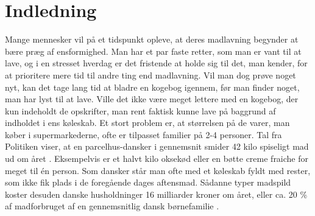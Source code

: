 \chapter{Indledning}
\label{chap:indledning}

Mange mennesker vil på et tidspunkt opleve, at deres madlavning begynder at bære præg af ensformighed. Man har et par faste retter, som man er vant til at lave, og i en stresset hverdag er det fristende at holde sig til det, man kender, for at prioritere mere tid til andre ting end madlavning. Vil man dog prøve noget nyt, kan det tage lang tid at bladre en kogebog igennem, før man finder noget, man har lyst til at lave. Ville det ikke være meget lettere med en kogebog, der kun indeholdt de opskrifter, man rent faktisk kunne lave på baggrund af indholdet i ens køleskab. Et stort problem er, at størrelsen på de varer, man køber i supermarkederne, ofte er tilpasset familier på 2-4 personer. Tal fra Politiken viser, at en parcelhus-dansker i gennemsnit smider 42 kilo spiseligt mad ud om året \cite{madspildpol}. Eksempelvis er et halvt kilo oksekød eller en bøtte creme fraiche for meget til én person. Som dansker står man ofte med et køleskab fyldt med rester, som ikke fik plads i de foregående dages aftensmad. Sådanne typer madspild koster desuden danske husholdninger 16 milliarder kroner om året, eller ca. 20 \% af madforbruget af en gennemsnitlig dansk børnefamilie \cite{madspild16}. 


